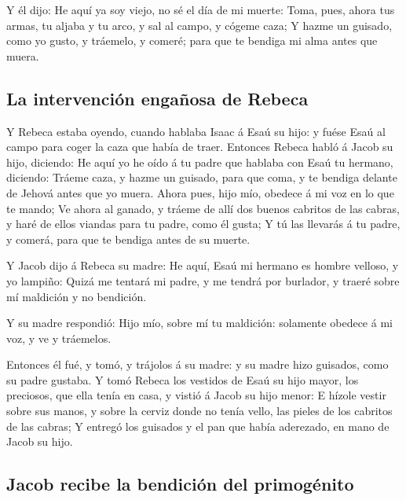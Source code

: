  Y él dijo: He aquí ya soy viejo, no sé el día de mi muerte:
 Toma, pues, ahora tus armas, tu aljaba y tu arco, y sal al
campo, y cógeme caza;  Y hazme un guisado, como yo gusto, y
tráemelo, y comeré; para que te bendiga mi alma antes que muera.

\hypertarget{la-intervenciuxf3n-engauxf1osa-de-rebeca}{%
\subsection{La intervención engañosa de
Rebeca}\label{la-intervenciuxf3n-engauxf1osa-de-rebeca}}

 Y Rebeca estaba oyendo, cuando hablaba Isaac á Esaú su
hijo: y fuése Esaú al campo para coger la caza que había de traer.
 Entonces Rebeca habló á Jacob su hijo, diciendo: He aquí yo
he oído á tu padre que hablaba con Esaú tu hermano, diciendo:
 Tráeme caza, y hazme un guisado, para que coma, y te
bendiga delante de Jehová antes que yo muera.  Ahora pues,
hijo mío, obedece á mi voz en lo que te mando;  Ve ahora al
ganado, y tráeme de allí dos buenos cabritos de las cabras, y haré de
ellos viandas para tu padre, como él gusta;  Y tú las
llevarás á tu padre, y comerá, para que te bendiga antes de su muerte.

 Y Jacob dijo á Rebeca su madre: He aquí, Esaú mi hermano
es hombre velloso, y yo lampiño:  Quizá me tentará mi
padre, y me tendrá por burlador, y traeré sobre mí maldición y no
bendición.

 Y su madre respondió: Hijo mío, sobre mí tu maldición:
solamente obedece á mi voz, y ve y tráemelos.

 Entonces él fué, y tomó, y trájolos á su madre: y su madre
hizo guisados, como su padre gustaba.  Y tomó Rebeca los
vestidos de Esaú su hijo mayor, los preciosos, que ella tenía en casa, y
vistió á Jacob su hijo menor:  E hízole vestir sobre sus
manos, y sobre la cerviz donde no tenía vello, las pieles de los
cabritos de las cabras;  Y entregó los guisados y el pan
que había aderezado, en mano de Jacob su hijo.

\hypertarget{jacob-recibe-la-bendiciuxf3n-del-primoguxe9nito}{%
\subsection{Jacob recibe la bendición del
primogénito}\label{jacob-recibe-la-bendiciuxf3n-del-primoguxe9nito}}

